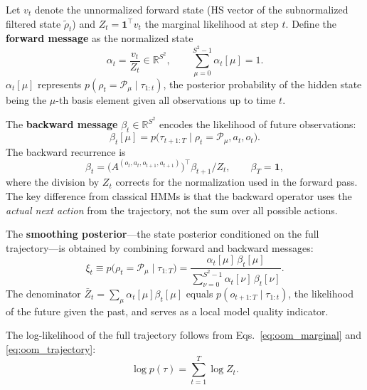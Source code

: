 
Let $v_t$ denote the unnormalized forward state (HS vector of the
subnormalized filtered state $\tilde\rho_t$) and $Z_t = \mathbf{1}^\top v_t$
the marginal likelihood at step $t$. Define the \textbf{forward message}
as the normalized state
\begin{equation}
\alpha_t = \frac{v_t}{Z_t} \in \mathbb{R}^{S^2},
\qquad \sum_{\mu=0}^{S^2-1} \alpha_t[\mu] = 1.
\label{eq:alpha_def}
\end{equation}
$\alpha_t[\mu]$ represents $p(\rho_t = \mathcal{P}_\mu \mid \tau_{1:t})$,
the posterior probability of the hidden state being the $\mu$-th basis
element given all observations up to time $t$.

The \textbf{backward message} $\beta_t \in \mathbb{R}^{S^2}$ encodes the
likelihood of future observations:
\begin{equation}
\beta_t[\mu] = p\bigl(\tau_{t+1:T} \mid \rho_t = \mathcal{P}_\mu, a_t, o_t\bigr).
\label{eq:beta_def}
\end{equation}
The backward recurrence is
\begin{equation}
\beta_t = \bigl(A^{(o_t, a_t, o_{t+1}, a_{t+1})}\bigr)^\top \beta_{t+1}
           \big/ Z_t,
\qquad \beta_T = \mathbf{1},
\label{eq:beta_recurrence}
\end{equation}
where the division by $Z_t$ corrects for the normalization used in the
forward pass. The key difference from classical HMMs is that the backward
operator uses the \emph{actual next action} from the trajectory, not the
sum over all possible actions.


The \textbf{smoothing posterior}—the state posterior conditioned on the
full trajectory—is obtained by combining forward and backward messages:
\begin{equation}
\xi_t \equiv p\!\bigl(\rho_t = \mathcal{P}_\mu \mid \tau_{1:T}\bigr)
        = \frac{\alpha_t[\mu] \, \beta_t[\mu]}
               {\sum_{\nu=0}^{S^2-1} \alpha_t[\nu] \, \beta_t[\nu]}.
\label{eq:smoothing_posterior}
\end{equation}
The denominator $\bar Z_t = \sum_\mu \alpha_t[\mu]\beta_t[\mu]$ equals
$p(o_{t+1:T} \mid \tau_{1:t})$, the likelihood of the future given the
past, and serves as a local model quality indicator.


The log-likelihood of the full trajectory follows from
Eqs.\ \eqref{eq:oom_marginal} and \eqref{eq:oom_trajectory}:
\begin{equation}
\log p(\tau) = \sum_{t=1}^T \log Z_t.
\label{eq:log_likelihood}
\end{equation}

